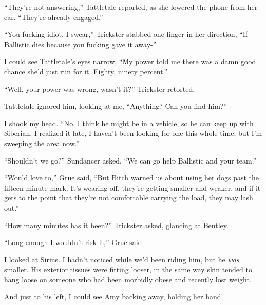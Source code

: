





``They're not answering,'' Tattletale reported, as she lowered the phone from her ear.  ``They're already engaged.''



``You fucking idiot.  I swear,'' Trickster stabbed one finger in her direction, ``If Ballistic dies because you fucking gave it away-''



I could see Tattletale's eyes narrow, ``My power told me there was a damn good chance she'd just run for it.  Eighty, ninety percent.''



``Well, your power was wrong, wasn't it?'' Trickster retorted.



Tattletale ignored him, looking at me, ``Anything?  Can you find him?''



I shook my head.  ``No.  I think he might be in a vehicle, so he can keep up with Siberian.  I realized it late, I haven't been looking for one this whole time, but I'm sweeping the area now.''



``Shouldn't we go?'' Sundancer asked.  ``We can go help Ballistic and your team.''



``Would love to,'' Grue said, ``But Bitch warned us about using her dogs past the fifteen minute mark.  It's wearing off, they're getting smaller and weaker, and if it gets to the point that they're not comfortable carrying the load, they may lash out.''



``How many minutes has it been?''  Trickster asked, glancing at Bentley.



``Long enough I wouldn't risk it,'' Grue said.



I looked at Sirius.  I hadn't noticed while we'd been riding him, but he \emph{was} smaller.  His exterior tissues were fitting looser, in the same way skin tended to hang loose on someone who had been morbidly obese and recently lost weight.



And just to his left, I could see Amy backing away, holding her hand.



